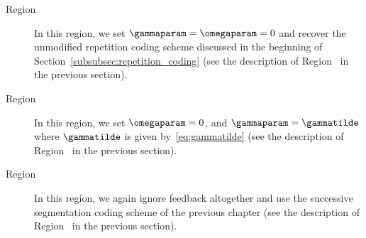 \begin{description}
	\item[Region~] In this region, we set $\gammaparam = \omegaparam = 0$ and recover the unmodified repetition coding scheme discussed in the beginning of Section~\ref{subsubsec:repetition_coding} (see the description of Region~ in the previous section).

	\item[Region~] In this region, we set $\omegaparam = 0$, and $\gammaparam = \gammatilde$ where $\gammatilde$ is given by~\eqref{eq:gammatilde} (see the description of Region~ in the previous section).

	
	\item[Region~]  In this region, we again ignore feedback altogether and use the successive segmentation coding scheme of the previous chapter (see the description of Region~ in the previous section).
\end{description}


